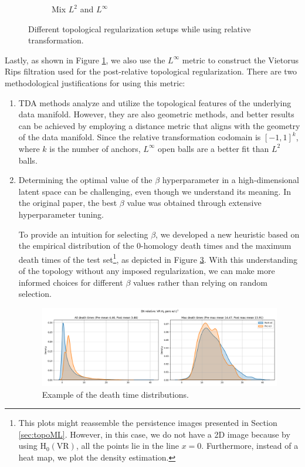 \documentclass[../main.tex]{subfiles}
\begin{document}
\begin{figure}[ht!]
\begin{subfigure}[b]{0.45\textwidth}
        \caption{Mix $L^2$ and $L^\infty$}
         \label{fig:relativeTopoMixScheme}
     \end{subfigure}
    \caption{Different topological regularization setups while using relative transformation.}
    \label{fig:topoSetups}
\end{figure}


Lastly, as shown in Figure \ref{fig:relativeTopoMixScheme}, we also use the $L^\infty$ metric to construct the Vietorus Rips filtration used for the post-relative topological regularization. There are two methodological justifications for using this metric:
\begin{enumerate}
    \item TDA methods analyze and utilize the topological features of the underlying data manifold. However, they are also geometric methods, and better results can be achieved by employing a distance metric that aligns with the geometry of the data manifold. Since the relative transformation codomain is $[-1, 1]^k$, where $k$ is the number of anchors, $L^\infty$ open balls are a better fit than $L^2$ balls.

    \item Determining the optimal value of the $\beta$ hyperparameter in a high-dimensional latent space can be challenging, even though we understand its meaning. In the original paper, the best $\beta$ value was obtained through extensive hyperparameter tuning.

    To provide an intuition for selecting $\beta$, we developed a new heuristic based on the empirical distribution of the 0-homology death times and the maximum death times of the test set\footnote{This plots might reassemble the persistence images presented in Section \ref{sec:topoML}. However, in this case, we do not have a 2D image because by using $\text{H}_0(\text{VR})$, all the points lie in the line $x=0$. Furthermore, instead of a heat map, we plot the density estimation.}, as depicted in Figure \ref{fig:h0Ex}. With this understanding of the topology without any imposed regularization, we can make more informed choices for different $\beta$ values rather than relying on random selection.

    \begin{figure}[!ht]
        \centering
        \includegraphics[width=\textwidth]{figures/mt/en_relative_seed0.png} 
        \caption{Example of the death time distributions.}
        \label{fig:h0Ex}
    \end{figure}


\end{enumerate}
\end{document}
